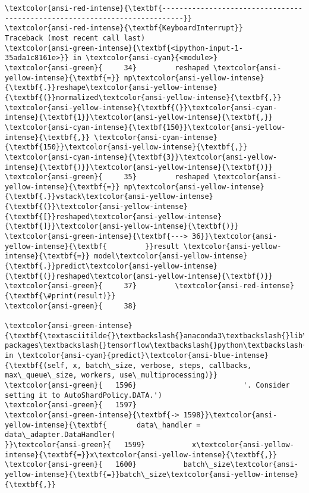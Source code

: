 \documentclass[11pt]{article}
\begin{document}
    \begin{Verbatim}[commandchars=\\\{\}, frame=single, framerule=2mm, rulecolor=\color{outerrorbackground}]
\textcolor{ansi-red-intense}{\textbf{---------------------------------------------------------------------------}}
\textcolor{ansi-red-intense}{\textbf{KeyboardInterrupt}}                         Traceback (most recent call last)
\textcolor{ansi-green-intense}{\textbf{<ipython-input-1-35ada1c8161e>}} in \textcolor{ansi-cyan}{<module>}
\textcolor{ansi-green}{     34}         reshaped \textcolor{ansi-yellow-intense}{\textbf{=}} np\textcolor{ansi-yellow-intense}{\textbf{.}}reshape\textcolor{ansi-yellow-intense}{\textbf{(}}normalized\textcolor{ansi-yellow-intense}{\textbf{,}} \textcolor{ansi-yellow-intense}{\textbf{(}}\textcolor{ansi-cyan-intense}{\textbf{1}}\textcolor{ansi-yellow-intense}{\textbf{,}} \textcolor{ansi-cyan-intense}{\textbf{150}}\textcolor{ansi-yellow-intense}{\textbf{,}} \textcolor{ansi-cyan-intense}{\textbf{150}}\textcolor{ansi-yellow-intense}{\textbf{,}} \textcolor{ansi-cyan-intense}{\textbf{3}}\textcolor{ansi-yellow-intense}{\textbf{)}}\textcolor{ansi-yellow-intense}{\textbf{)}}
\textcolor{ansi-green}{     35}         reshaped \textcolor{ansi-yellow-intense}{\textbf{=}} np\textcolor{ansi-yellow-intense}{\textbf{.}}vstack\textcolor{ansi-yellow-intense}{\textbf{(}}\textcolor{ansi-yellow-intense}{\textbf{[}}reshaped\textcolor{ansi-yellow-intense}{\textbf{]}}\textcolor{ansi-yellow-intense}{\textbf{)}}
\textcolor{ansi-green-intense}{\textbf{---> 36}}\textcolor{ansi-yellow-intense}{\textbf{         }}result \textcolor{ansi-yellow-intense}{\textbf{=}} model\textcolor{ansi-yellow-intense}{\textbf{.}}predict\textcolor{ansi-yellow-intense}{\textbf{(}}reshaped\textcolor{ansi-yellow-intense}{\textbf{)}}
\textcolor{ansi-green}{     37}         \textcolor{ansi-red-intense}{\textbf{\#print(result)}}
\textcolor{ansi-green}{     38} 

\textcolor{ansi-green-intense}{\textbf{\textasciitilde{}\textbackslash{}anaconda3\textbackslash{}lib\textbackslash{}site-packages\textbackslash{}tensorflow\textbackslash{}python\textbackslash{}keras\textbackslash{}engine\textbackslash{}training.py}} in \textcolor{ansi-cyan}{predict}\textcolor{ansi-blue-intense}{\textbf{(self, x, batch\_size, verbose, steps, callbacks, max\_queue\_size, workers, use\_multiprocessing)}}
\textcolor{ansi-green}{   1596}                         '. Consider setting it to AutoShardPolicy.DATA.')
\textcolor{ansi-green}{   1597} 
\textcolor{ansi-green-intense}{\textbf{-> 1598}}\textcolor{ansi-yellow-intense}{\textbf{       data\_handler = data\_adapter.DataHandler(
}}\textcolor{ansi-green}{   1599}           x\textcolor{ansi-yellow-intense}{\textbf{=}}x\textcolor{ansi-yellow-intense}{\textbf{,}}
\textcolor{ansi-green}{   1600}           batch\_size\textcolor{ansi-yellow-intense}{\textbf{=}}batch\_size\textcolor{ansi-yellow-intense}{\textbf{,}}


\end{Verbatim}
\end{document}
